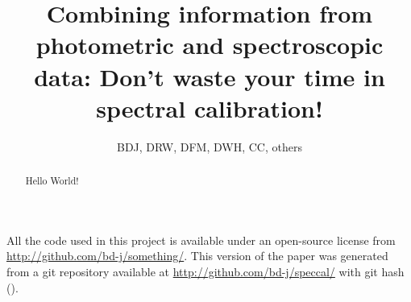 \documentclass[12pt, preprint]{aastex}
\begin{document}
\title{Combining information from photometric and spectroscopic data:
  Don't waste your time in spectral calibration!}
\author{BDJ, DRW, DFM, DWH, CC, others}

\begin{abstract}
Hello World!
\end{abstract}


All the code used in this project is available under an open-source license
  from \url{http://github.com/bd-j/something/}.
This version of the paper was generated
  from a git repository available at \url{http://github.com/bd-j/speccal/}
  with git hash \texttt{\githash} (\gitdate).
\end{document}
